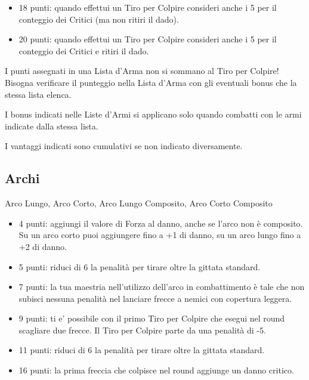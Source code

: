 \begin{multicols}{2}
\begin{itemize}[leftmargin=*]
\item 18 punti: quando effettui un Tiro per Colpire consideri anche i 5 per il conteggio dei Critici (ma non ritiri il dado).

\item 20 punti: quando effettui un Tiro per Colpire consideri anche i 5 per il conteggio dei Critici e ritiri il dado.

\end{itemize}

I punti assegnati in una Lista d'Arma non si sommano al Tiro per Colpire! Bisogna verificare il punteggio nella Lista d'Arma con gli eventuali bonus che la stessa lista elenca.

I bonus indicati nelle Liste d'Armi si applicano solo quando combatti con le armi indicate dalla stessa lista.

I vantaggi indicati sono cumulativi se non indicato diversamente.

\subsection{Archi}  Arco Lungo, Arco Corto, Arco Lungo Composito, Arco Corto Composito\label{listaarmiarchi}

\begin{itemize}[leftmargin=*] \setlength{\itemsep}{0pt}

\item 4 punti: aggiungi il valore di Forza al danno, anche se l'arco non è composito. Su un arco corto puoi aggiungere fino a +1 di danno, su un arco lungo fino a +2 di danno.
\item 5 punti: riduci di 6 la penalità per tirare oltre la gittata standard.
\item 7 punti: la tua maestria nell'utilizzo dell'arco in combattimento è tale che non subisci nessuna penalità nel lanciare frecce a nemici con copertura leggera.
\item 9 punti: ti e' possibile con il primo Tiro per Colpire che esegui nel round scagliare due frecce. Il Tiro per Colpire parte da una penalità di -5.
\item 11 punti: riduci di 6 la penalità per tirare oltre la gittata standard.
\item 16 punti: la prima freccia che colpisce nel round aggiunge un danno critico.

\end{itemize}


\end{multicols}
